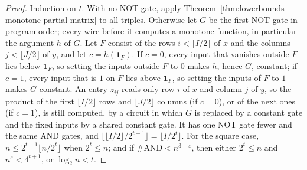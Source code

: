 \begin{proof}
  \leanok
  Induction on $t$. With no NOT gate, apply
  Theorem~\ref{thm:lowerbounds-monotone-partial-matrix} to all triples.
  Otherwise let $G$ be the first NOT gate in program order; every wire before
  it computes a monotone function, in particular the argument $h$ of $G$. Let
  $F$ consist of the rows $i < \lfloor I/2 \rfloor$ of $x$ and the columns
  $j < \lfloor J/2 \rfloor$ of $y$, and let $c = h(\mathbf 1_F)$. If $c = 0$, every
  input that vanishes outside $F$ lies below $\mathbf 1_F$, so setting the
  inputs outside $F$ to $0$ makes $h$, hence $G$, constant; if $c = 1$, every
  input that is $1$ on $F$ lies above $\mathbf 1_F$, so setting the inputs of
  $F$ to $1$ makes $G$ constant. An entry $z_{ij}$ reads only row $i$ of $x$
  and column $j$ of $y$, so the product of the first
  $\lfloor I/2 \rfloor$ rows and $\lfloor J/2 \rfloor$ columns (if $c = 0$),
  or of the next ones (if $c = 1$), is still computed, by a circuit in which
  $G$ is replaced by a constant gate and the fixed inputs by a shared constant
  gate. It has one NOT gate fewer and the same AND gates, and
  $\lfloor \lfloor I/2 \rfloor / 2^{t - 1} \rfloor = \lfloor I / 2^t \rfloor$.
  For the square case, $n \le 2^{t + 1} \lfloor n / 2^t \rfloor$ when
  $2^t \le n$; and if $\#\mathrm{AND} < n^{3 - \varepsilon}$, then either
  $2^t \le n$ and $n^\varepsilon < 4^{t + 1}$, or $\log_2 n < t$.
\end{proof}

